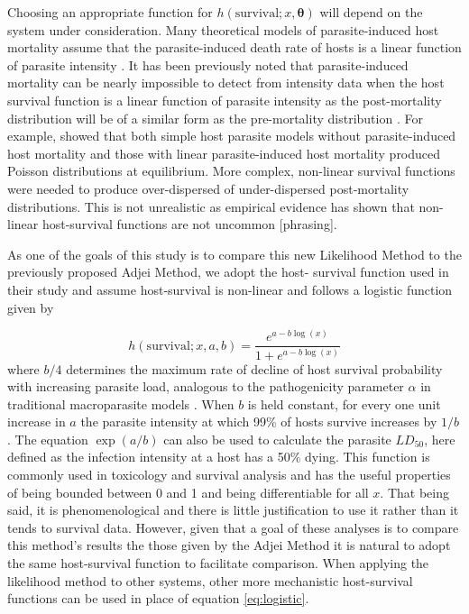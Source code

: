 \documentclass[12pt, a4paper]{article}
\begin{document}
Choosing an appropriate function for $h(\text{survival}; x, \boldsymbol{\theta})$ will depend on the system under consideration.  Many theoretical models of
parasite-induced host mortality assume that the parasite-induced death rate of
hosts is a linear function of parasite intensity
\citep{AndersonandMay1978,Dobson1992,Barbour2000}. It has been previously noted that parasite-induced mortality can be nearly impossible to detect from intensity data when the host survival function is a linear function of parasite intensity as the post-mortality distribution will be of a similar form as the pre-mortality distribution \citep{Lanciani1989}. For example, \cite{Barbour2000} showed that both simple host parasite models without parasite-induced host mortality and those with linear parasite-induced host mortality produced Poisson distributions at equilibrium. More complex, non-linear survival functions were needed to produce over-dispersed of under-dispersed post-mortality distributions.  This is not unrealistic as empirical evidence has shown that non-linear host-survival functions are not uncommon
\citep{Benesh2011} [phrasing].

As one of the goals of this study is to compare this new
Likelihood Method to the previously proposed Adjei Method, we adopt the host-
survival function used in their study and assume host-survival is non-linear and follows a logistic function given by

\begin{equation}
    h(\text{survival}; x, a, b) = \dfrac{e^{a - b \log(x)}}{1 + e^{a - b \log(x)}}
    \label{eq:logistic}
\end{equation}
where $b / 4$ determines the maximum rate of decline of
host survival probability with increasing parasite load, analogous to the pathogenicity parameter $\alpha$ in traditional macroparasite models \citep{AndersonandMay1978}.  When $b$ is held constant, for every one unit increase in $a$ the parasite intensity at which 99\% of hosts survive increases by $ 1/ b$.  The equation $\exp(a
/ b)$ can also be used to calculate the parasite $LD_{50}$, here defined as the
infection intensity at a host has a 50\% dying.  This function is commonly used in toxicology and survival analysis and has the useful properties of being bounded between 0 and 1 and being differentiable for all $x$.  That being said, it is phenomenological and there is little justification to use it rather than it tends to survival data. However, given that a goal of these analyses is to
compare this method's results the those given by the Adjei Method it is natural
to adopt the same host-survival function to facilitate comparison.  When
applying the likelihood method to other systems, other more mechanistic host-survival functions can be used in place of equation \ref{eq:logistic}.
\end{document}
